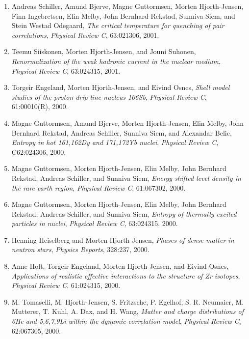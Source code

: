\documentclass[%
oneside,                 %
final,                   %
10pt]{article}
\begin{document}
\begin{enumerate}
\item Andreas Schiller, Amund Bjerve, Magne Guttormsen, Morten Hjorth-Jensen, Finn   Ingebretsen, Elin Melby, John Bernhard Rekstad, Sunniva Siem, and   Stein Westad Odegaard, \emph{The critical temperature for quenching of pair correlations},  \emph{Physical Review C}, 63:021306, 2001. 

\item Teemu Siiskonen, Morten Hjorth-Jensen, and Jouni Suhonen, \emph{Renormalization of the weak hadronic current in the nuclear medium},  \emph{Physical Review C}, 63:024315, 2001. 

\item Torgeir Engeland, Morten Hjorth-Jensen, and Eivind Osnes, \emph{Shell model studies of the proton drip line nucleus 106Sb},  \emph{Physical Review C}, 61:00010(R), 2000. 

\item Magne Guttormsen, Amund Bjerve, Morten Hjorth-Jensen, Elin Melby, John Bernhard   Rekstad, Andreas Schiller, Sunniva Siem, and Alexandar Belic, \emph{Entropy in hot 161,162Dy and 171,172Yb nuclei},  \emph{Physical Review C}, C62:024306, 2000. 

\item Magne Guttormsen, Morten Hjorth-Jensen, Elin Melby, John Bernhard Rekstad,   Andreas Schiller, and Sunniva Siem, \emph{Energy shifted level density in the rare earth region}, \emph{Physical Review C}, 61:067302, 2000. 

\item Magne Guttormsen, Morten Hjorth-Jensen, Elin Melby, John Bernhard Rekstad,   Andreas Schiller, and Sunniva Siem, \emph{Entropy of thermally excited particles in nuclei},  \emph{Physical Review C}, 63:024315, 2000. 

\item Henning Heiselberg and Morten Hjorth-Jensen, \emph{Phases of dense matter in neutron stars},  \emph{Physics Reports}, 328:237, 2000. 

\item Anne Holt, Torgeir Engeland, Morten Hjorth-Jensen, and Eivind Osnes, \emph{Applications of realistic effective interactions to the structure of Zr isotopes},  \emph{Physical Review C}, 61:024315, 2000. 

\item M. Tomaselli, M. Hjorth-Jensen, S. Fritzsche, P. Egelhof, S. R. Neumaier,   M. Mutterer, T. Kuhl, A. Dax, and H. Wang, \emph{Matter and charge distributions of 6He and 5,6,7,9Li   within the dynamic-correlation model},  \emph{Physical Review C}, 62:067305, 2000. 


\end{enumerate}
\end{document}
